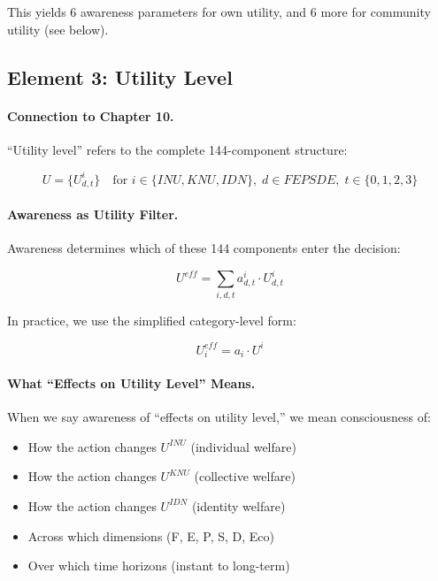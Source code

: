 This yields 6 awareness parameters for own utility, and 6 more for 
community utility (see below).

\subsection{Element 3: Utility Level}
\label{subsec:utility-level}

\paragraph{Connection to Chapter 10.}
``Utility level'' refers to the complete 144-component structure:

\begin{equation}
U = \{U^i_{d,t}\} \quad \text{for } i \in \{INU, KNU, IDN\}, \; d \in FEPSDE, \; t \in \{0,1,2,3\}
\end{equation}

\paragraph{Awareness as Utility Filter.}
Awareness determines which of these 144 components enter the decision:

\begin{equation}
U^{eff} = \sum_{i,d,t} a^i_{d,t} \cdot U^i_{d,t}
\end{equation}

In practice, we use the simplified category-level form:

\begin{equation}
U^{eff}_i = a_i \cdot U^i
\end{equation}

\paragraph{What ``Effects on Utility Level'' Means.}
When we say awareness of ``effects on utility level,'' we mean consciousness of:

\begin{itemize}
\item How the action changes $U^{INU}$ (individual welfare)
\item How the action changes $U^{KNU}$ (collective welfare)
\item How the action changes $U^{IDN}$ (identity welfare)
\item Across which dimensions (F, E, P, S, D, Eco)
\item Over which time horizons (instant to long-term)
\end{itemize}

